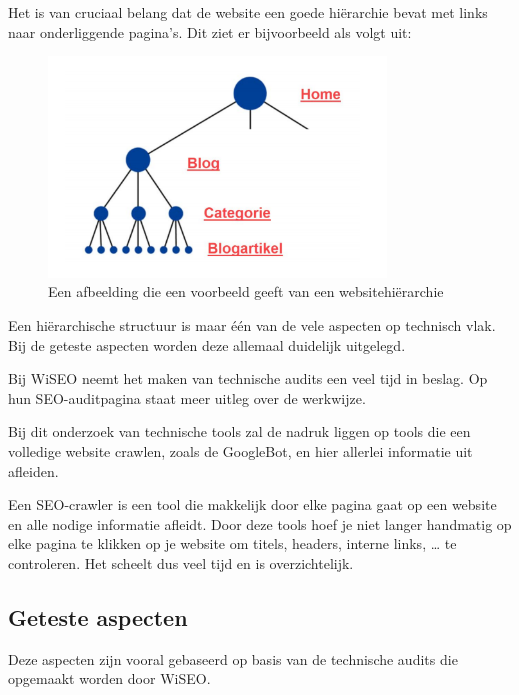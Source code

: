 Het is van cruciaal belang dat de website een goede hiërarchie bevat met links naar onderliggende pagina’s. Dit ziet er bijvoorbeeld als volgt uit: 

\begin{figure}[h!]
\centering
\includegraphics[width=0.8\textwidth]{img/Websitestructuur.png}
\caption{Een afbeelding die een voorbeeld geeft van een websitehiërarchie}
\end{figure}

Een hiërarchische structuur is maar één van de vele aspecten op technisch vlak. Bij de geteste aspecten worden deze allemaal duidelijk uitgelegd.

Bij WiSEO neemt het maken van technische audits een veel tijd in beslag. Op hun SEO-auditpagina staat meer uitleg over de werkwijze. \textcite{AUDIT} 

Bij dit onderzoek van technische tools zal de nadruk liggen op tools die een volledige website crawlen, zoals de GoogleBot, en hier allerlei informatie uit afleiden.

Een SEO-crawler is een tool die makkelijk door elke pagina gaat op een website en alle nodige informatie afleidt. Door deze tools hoef je niet langer handmatig op elke pagina te klikken op je website om titels, headers, interne links, … te controleren. Het scheelt dus veel tijd en is overzichtelijk. 


\subsection{Geteste aspecten}
\label{ch: Geteste aspecten}

Deze aspecten zijn vooral gebaseerd op basis van de technische audits die opgemaakt worden door WiSEO.

